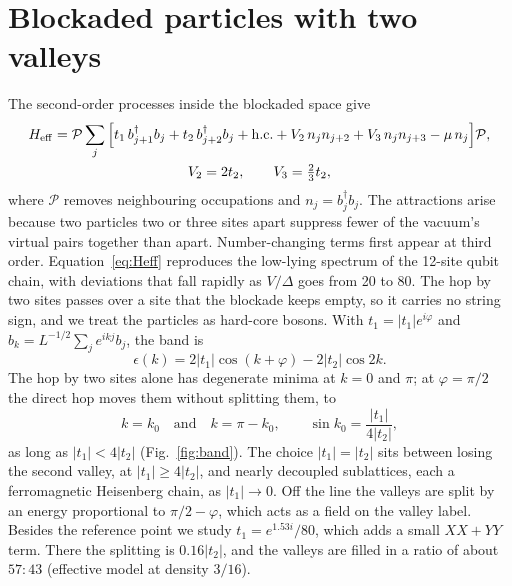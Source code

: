 \documentclass[11pt]{article}
\begin{document}
\section{Blockaded particles with two valleys}

The second-order processes inside the blockaded space give
\begin{equation}
\begin{gathered}
H_{\rm eff}=\mathcal P\sum_j\Big[t_1\,b^\dagger_{j+1}b_j+t_2\,b^\dagger_{j+2}b_j+\mathrm{h.c.}+V_2\,n_jn_{j+2}+V_3\,n_jn_{j+3}-\mu\,n_j\Big]\mathcal P,\\
V_2=2t_2,\qquad V_3=\tfrac23t_2,
\end{gathered}
\label{eq:Heff}
\end{equation}
where $\mathcal P$ removes neighbouring occupations and $n_j=b^\dagger_jb_j$. The attractions arise because two particles two or three sites apart suppress fewer of the vacuum's virtual pairs together than apart. Number-changing terms first appear at third order. Equation~\eqref{eq:Heff} reproduces the low-lying spectrum of the 12-site qubit chain, with deviations that fall rapidly as $V/\Delta$ goes from 20 to 80. The hop by two sites passes over a site that the blockade keeps empty, so it carries no string sign, and we treat the particles as hard-core bosons. With $t_1=|t_1|e^{i\varphi}$ and $b_k=L^{-1/2}\sum_je^{ikj}b_j$, the band is
\begin{equation}
\epsilon(k)=2|t_1|\cos(k+\varphi)-2|t_2|\cos2k .
\label{eq:band}
\end{equation}
The hop by two sites alone has degenerate minima at $k=0$ and $\pi$; at $\varphi=\pi/2$ the direct hop moves them without splitting them, to
\begin{equation}
k=k_0\quad\text{and}\quad k=\pi-k_0,\qquad \sin k_0=\frac{|t_1|}{4|t_2|},
\label{eq:k0}
\end{equation}
as long as $|t_1|<4|t_2|$ (Fig.~\ref{fig:band}). The choice $|t_1|=|t_2|$ sits between losing the second valley, at $|t_1|\ge4|t_2|$, and nearly decoupled sublattices, each a ferromagnetic Heisenberg chain, as $|t_1|\to0$. Off the line the valleys are split by an energy proportional to $\pi/2-\varphi$, which acts as a field on the valley label. Besides the reference point we study $t_1=e^{1.53i}/80$, which adds a small $XX+YY$ term. There the splitting is $0.16|t_2|$, and the valleys are filled in a ratio of about $57{:}43$ (effective model at density $3/16$).
\end{document}
